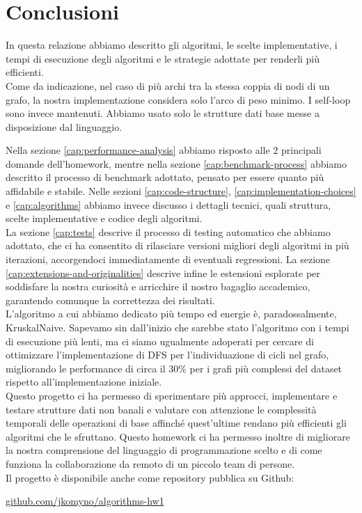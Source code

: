\section{Conclusioni}
\label{cap:conclusions}

In questa relazione abbiamo descritto gli algoritmi, le scelte implementative, i tempi di esecuzione degli algoritmi e le strategie adottate per renderli più efficienti. \\

\noindent Come da indicazione, nel caso di più archi tra la stessa coppia di nodi di un grafo, la nostra implementazione considera solo l'arco di peso minimo. I self-loop sono invece mantenuti. Abbiamo usato solo le strutture dati base messe a disposizione dal linguaggio.

\noindent Nella sezione \ref{cap:performance-analysis} abbiamo risposto alle 2 principali domande dell'homework, mentre nella sezione \ref{cap:benchmark-process} abbiamo descritto il processo di benchmark adottato, pensato per essere quanto più affidabile e stabile.
Nelle sezioni \ref{cap:code-structure}, \ref{cap:implementation-choices} e \ref{cap:algorithms} abbiamo invece discusso i dettagli tecnici, quali struttura, scelte implementative e codice degli algoritmi. \\

\noindent  La sezione \ref{cap:tests} descrive il processo di testing automatico che abbiamo adottato, che ci ha consentito di rilasciare versioni migliori degli algoritmi in più iterazioni, accorgendoci immediatamente di eventuali regressioni. La sezione \ref{cap:extensions-and-originalities} descrive infine le estensioni esplorate per soddisfare la nostra curiosità e arricchire il nostro bagaglio accademico, garantendo comunque la correttezza dei risultati. \\

\noindent L'algoritmo a cui abbiamo dedicato più tempo ed energie è, paradossalmente, KruskalNaive. Sapevamo sin dall'inizio che sarebbe stato l'algoritmo con i tempi di esecuzione più lenti, ma ci siamo ugualmente adoperati per cercare di ottimizzare l'implementazione di DFS per l'individuazione di cicli nel grafo, migliorando le performance di circa il 30\% per i grafi più complessi del dataset rispetto all'implementazione iniziale.\\

\noindent Questo progetto ci ha permesso di sperimentare più approcci, implementare e testare strutture dati non banali e valutare con attenzione le complessità temporali delle operazioni di base affinché quest'ultime rendano più efficienti gli algoritmi che le sfruttano. Questo homework ci ha permesso inoltre di migliorare la nostra comprensione del linguaggio di programmazione scelto e di come funziona la collaborazione da remoto di un piccolo team di persone. \\

\noindent Il progetto è disponibile anche come repository pubblica su Github:

\begin{center}
\href{https://github.com/jkomyno/algorithms-hw1}{github.com/jkomyno/algorithms-hw1}
\end{center}
